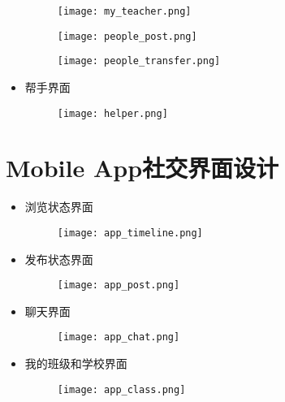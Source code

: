 \begin{itemize}
\begin{figure}[H]
  \centering
  \texttt{[image: my\_teacher.png]}
  \label{fig: pc_my_teacher}
\end{figure}


\begin{figure}[H]
  \centering
  \texttt{[image: people\_post.png]}
  \label{fig: pc_people_post}
\end{figure}

\begin{figure}[H]
  \centering
  \texttt{[image: people\_transfer.png]}
  \label{fig: pc_people_transfer}
\end{figure}


\item 帮手界面

\begin{figure}[H]
  \centering
  \texttt{[image: helper.png]}
  \label{fig: pc_helper}
\end{figure}


\end{itemize}




\section{Mobile App社交界面设计}

\begin{itemize}

\item 浏览状态界面

\begin{figure}[H]
  \centering
  \texttt{[image: app\_timeline.png]}
  \label{fig: app_timeline}
\end{figure}


\item 发布状态界面

\begin{figure}[H]
  \centering
  \texttt{[image: app\_post.png]}
  \label{fig: app_post}
\end{figure}



\item 聊天界面


\begin{figure}[H]
  \centering
  \texttt{[image: app\_chat.png]}
  \label{fig: app_chat}
\end{figure}


\item 我的班级和学校界面


\begin{figure}[H]
  \centering
  \texttt{[image: app\_class.png]}
  \label{fig: app_class}
\end{figure}


\end{itemize}
